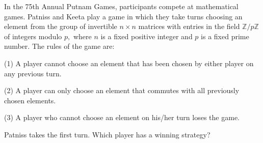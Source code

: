 In the 75th Annual Putnam Games, participants compete at mathematical games. Patniss and Keeta play a game in which they take turns choosing an element from the group of invertible $n\times n$ matrices with entries in the field $\mathbb{Z}/p\mathbb{Z}$ of integers modulo $p,$ where $n$ is a fixed positive integer and $p$ is a fixed prime number. The rules of the game are:

(1) A player cannot choose an element that has been chosen by either player on any previous turn.

(2) A player can only choose an element that commutes with all previously chosen elements.

(3) A player who cannot choose an element on his/her turn loses the game.

Patniss takes the first turn. Which player has a winning strategy?